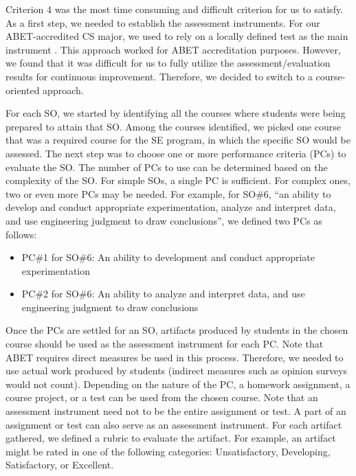 \documentclass{article}
\begin{document}
Criterion 4 was the most time consuming and difficult criterion for us to satisfy.  As a first step, we needed to establish the assessment instruments.  For our ABET-accredited CS major, we used to rely on a locally defined test as the main instrument \cite{fu14}.  This approach worked for ABET accreditation purposes.  However, we found that it was difficult for us to fully utilize the assessment/evaluation results for continuous improvement.  Therefore, we decided to switch to a course-oriented approach.  

For each SO, we started by identifying all the courses where students were being prepared to attain that SO.  Among the courses identified, we picked one course that was a required course for the SE program, in which the specific SO would be assessed.  The next step was to choose one or more performance criteria (PCs) to evaluate the SO.  The number of PCs to use can be determined based on the complexity of the SO.  For simple SOs, a single PC is sufficient.  For complex ones, two or even more PCs may be needed.  For example, for SO\#6, ``an ability to develop and conduct appropriate experimentation, analyze and interpret data, and use engineering judgment to draw conclusions'', we defined two PCs as follows:

\begin{itemize}[noitemsep]
\item PC\#1 for SO\#6: An ability to development and conduct appropriate experimentation
\item PC\#2 for SO\#6: An ability to analyze and interpret data, and use engineering judgment to draw conclusions
\end{itemize}

Once the PCs are settled for an SO, artifacts produced by students in the chosen course should be used as the assessment instrument for each PC.  Note that ABET requires direct measures be used in this process.  Therefore, we needed to use actual work produced by students (indirect measures such as opinion surveys would not count).  Depending on the nature of the PC, a homework assignment, a course project, or a test can be used from the chosen course.  Note that an assessment instrument need not to be the entire assignment or test.  A part of an assignment or test can also serve as an assessment instrument.  For each artifact gathered, we defined a rubric to evaluate the artifact.  For example, an artifact might be rated in one of the following categories: Unsatisfactory, Developing, Satisfactory, or Excellent.
\end{document}
